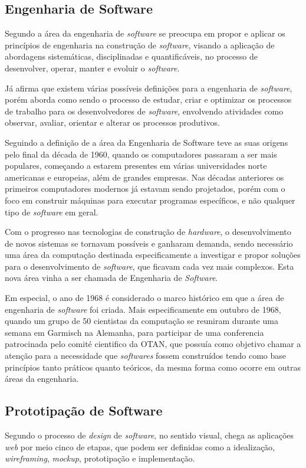 \subsection{Engenharia de Software}

Segundo \cite{2020:Valente} a área da engenharia de \emph{software}
se preocupa em propor e aplicar os princípios de engenharia na construção de
\emph{software}, visando a aplicação de abordagens sistemáticas, disciplinadas
e quantificáveis, no processo de desenvolver, operar, manter e evoluir
o \emph{software}.

Já \cite{2019:Wazlawick} afirma que existem várias possíveis definições para a
engenharia de \emph{software}, porém aborda como sendo o processo de
estudar, criar e optimizar os processos de trabalho para os desenvolvedores
de \emph{software}, envolvendo atividades como observar, avaliar, orientar e alterar
os processos produtivos.

Seguindo a definição de \cite{2020:Valente} a área da Engenharia de Software teve as suas
origens pelo final da década de 1960, quando os computadores passaram a ser mais
populares, começando a estarem presentes em várias universidades norte americanas
e europeias, além de grandes empresas. Nas décadas anteriores os primeiros
computadores modernos já estavam sendo projetados, porém com o foco em construir
máquinas para executar programas específicos, e não qualquer tipo de \emph{software}
em geral.

Com o progresso nas tecnologias de construção de \emph{hardware}, o desenvolvimento
de novos sistemas se tornavam possíveis e ganharam demanda, sendo necessário uma
área da computação destinada especificamente a investigar e propor soluções para
o desenvolvimento de \emph{software}, que ficavam cada vez mais complexos. Esta
nova área vinha a ser chamada de Engenharia de \emph{Software}.

Em especial, o ano de 1968 é considerado o marco histórico em que a área
de engenharia de \emph{software} foi criada. Mais especificamente em outubro
de 1968, quando um grupo de 50 cientistas da computação se reuniram durante
uma semana em Garmisch na Alemanha, para participar de uma conferencia
patrocinada pelo comité cientifico da OTAN, que possuía como objetivo
chamar a atenção para a necessidade que \emph{softwares} fossem construídos
tendo como base princípios tanto práticos quanto teóricos, da mesma forma
como ocorre em outras áreas da engenharia.

\subsection{Prototipação de Software}
Segundo \cite{uzayr:mockups} o processo de \emph{design} de \emph{software},
no sentido visual, chega as aplicações \emph{web} por meio cinco de etapas,
que podem ser definidas como a idealização, \emph{wireframing}, \emph{mockup},
prototipação e implementação.

